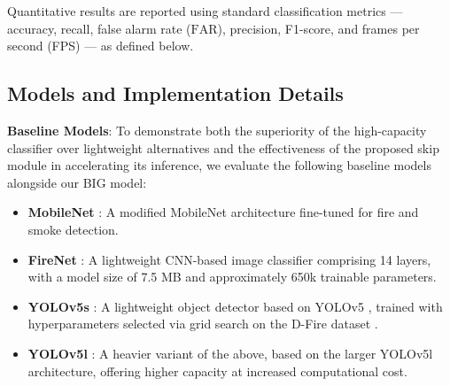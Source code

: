 \documentclass[
  10pt,
]{article}
\begin{document}
Quantitative results are reported using standard classification metrics
--- accuracy, recall, false alarm rate (\(\mathrm{FAR}\)), precision,
F1-score, and frames per second (FPS) --- as defined below.



\subsection{Models and Implementation Details}\label{sec:baselines}

\textbf{Baseline Models}: To demonstrate both the superiority of the
high-capacity classifier over lightweight alternatives and the
effectiveness of the proposed skip module in accelerating its inference,
we evaluate the following baseline models alongside our BIG model:

\begin{itemize}
\item
  \textbf{MobileNet} : A
  modified MobileNet architecture fine-tuned for fire and smoke
  detection.
\item
  \textbf{FireNet} : A
  lightweight CNN-based image classifier comprising 14 layers, with a
  model size of 7.5 MB and approximately 650k trainable parameters.
\item
  \textbf{YOLOv5s} : A lightweight
  object detector based on YOLOv5
  , trained with
  hyperparameters selected via grid search on the D-Fire dataset
  .
\item
  \textbf{YOLOv5l} : A heavier
  variant of the above, based on the larger YOLOv5l architecture,
  offering higher capacity at increased computational cost.
\end{itemize}
\end{document}
